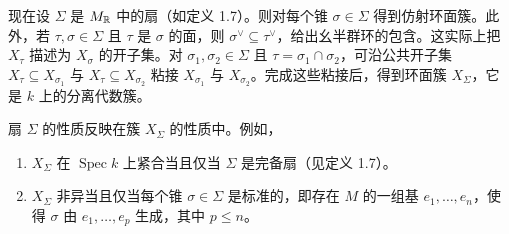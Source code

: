 
现在设 $\Sigma$ 是 $M_{\mathbb{R}}$ 中的扇（如定义 1.7）。则对每个锥 $\sigma\in\Sigma$ 得到仿射环面簇。此外，若 $\tau,\sigma\in\Sigma$ 且 $\tau$ 是 $\sigma$ 的面，则 $\sigma^{\vee}\subseteq\tau^{\vee}$，给出幺半群环的包含。这实际上把 $X_\tau$ 描述为 $X_\sigma$ 的开子集。对 $\sigma_1,\sigma_2\in\Sigma$ 且 $\tau=\sigma_1\cap\sigma_2$，可沿公共开子集 $X_\tau\subseteq X_{\sigma_1}$ 与 $X_\tau\subseteq X_{\sigma_2}$ 粘接 $X_{\sigma_1}$ 与 $X_{\sigma_2}$。完成这些粘接后，得到环面簇 $X_\Sigma$，它是 $k$ 上的分离代数簇。

扇 $\Sigma$ 的性质反映在簇 $X_\Sigma$ 的性质中。例如，
\begin{enumerate}[label=(\arabic*),leftmargin=*]
\item $X_\Sigma$ 在 $\operatorname{Spec} k$ 上紧合当且仅当 $\Sigma$ 是完备扇（见定义 1.7）。
\item $X_\Sigma$ 非异当且仅当每个锥 $\sigma\in\Sigma$ 是标准的，即存在 $M$ 的一组基 $e_1,\ldots,e_n$，使得 $\sigma$ 由 $e_1,\ldots,e_p$ 生成，其中 $p\le n$。
\end{enumerate}


